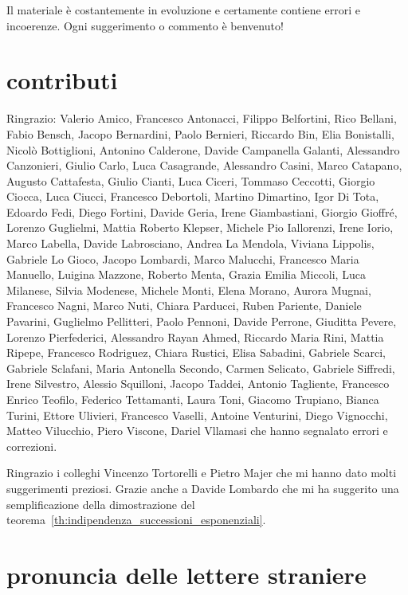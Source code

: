 Il materiale è costantemente in evoluzione %
e certamente contiene errori e incoerenze. Ogni suggerimento o commento è %
benvenuto! %


\section*{contributi}

Ringrazio:
%
Valerio Amico,
Francesco Antonacci,
Filippo Belfortini,
Rico Bellani,
Fabio Bensch,
Jacopo Bernardini,
Paolo Bernieri,
Riccardo Bin,
Elia Bonistalli,
Nicolò Bottiglioni,
Antonino Calderone,
Davide Campanella Galanti,
Alessandro Canzonieri,
Giulio Carlo,
Luca Casagrande,
Alessandro Casini,
Marco Catapano,
Augusto Cattafesta,
Giulio Cianti,
Luca Ciceri,
Tommaso Ceccotti,
Giorgio Ciocca,
Luca Ciucci,
Francesco Debortoli,
Martino Dimartino,
Igor Di Tota,
Edoardo Fedi,
Diego Fortini,
Davide Geria,
Irene Giambastiani,
Giorgio Gioffré,
Lorenzo Guglielmi,
Mattia Roberto Klepser,
Michele Pio Iallorenzi,
Irene Iorio,
Marco Labella,
Davide Labrosciano,
Andrea La Mendola,
Viviana Lippolis,
Gabriele Lo Gioco,
Jacopo Lombardi,
Marco Malucchi,
Francesco Maria Manuello,
Luigina Mazzone,
Roberto Menta,
Grazia Emilia Miccoli,
Luca Milanese,
Silvia Modenese,
Michele Monti,
Elena Morano,
Aurora Mugnai,
Francesco Nagni,
Marco Nuti,
Chiara Parducci,
Ruben Pariente,
Daniele Pavarini,
Guglielmo Pellitteri,
Paolo Pennoni,
Davide Perrone,
Giuditta Pevere,
Lorenzo Pierfederici,
Alessandro Rayan Ahmed,
Riccardo Maria Rini,
Mattia Ripepe,
Francesco Rodriguez,
Chiara Rustici,
Elisa Sabadini,
Gabriele Scarci,
Gabriele Sclafani,
Maria Antonella Secondo,
Carmen Selicato,
Gabriele Siffredi,
Irene Silvestro,
Alessio Squilloni,
Jacopo Taddei,
Antonio Tagliente,
Francesco Enrico Teofilo,
Federico Tettamanti,
Laura Toni,
Giacomo Trupiano,
Bianca Turini,
Ettore Ulivieri,
Francesco Vaselli,
Antoine Venturini,
Diego Vignocchi,
Matteo Vilucchio,
Piero Viscone,
Dariel Vllamasi
%
che hanno segnalato errori e correzioni.

Ringrazio i colleghi Vincenzo Tortorelli e Pietro Majer
che mi hanno dato molti suggerimenti preziosi.
Grazie anche a Davide Lombardo che mi ha suggerito una semplificazione 
della dimostrazione del teorema~\ref{th:indipendenza_successioni_esponenziali}.

\newpage

\section*{pronuncia delle lettere straniere}

